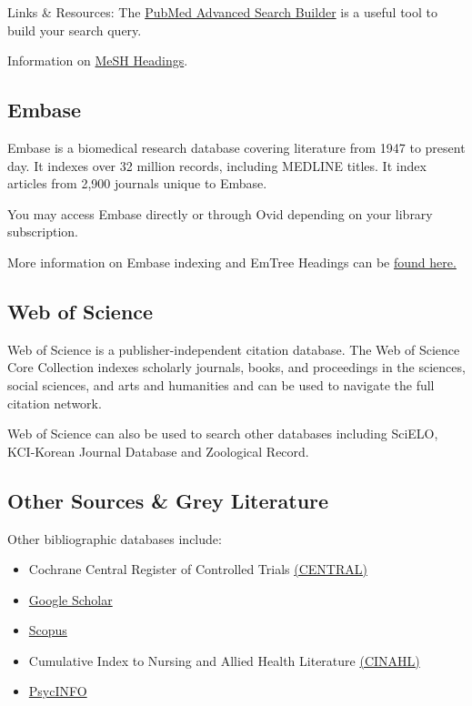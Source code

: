 \documentclass[
]{book}
\providecommand{\tightlist}{%
  \setlength{\itemsep}{0pt}\setlength{\parskip}{0pt}}
\begin{document}
Links \& Resources:
The \href{https://www.ncbi.nlm.nih.gov/pubmed/advanced}{PubMed Advanced Search Builder} is a useful tool to build your search query.

Information on \href{https://www.nlm.nih.gov/mesh/meshhome.html}{MeSH Headings}.

\hypertarget{embase}{%
\subsection{Embase}\label{embase}}

Embase is a biomedical research database covering literature from 1947 to present day. It indexes over 32 million records, including MEDLINE titles. It index articles from 2,900 journals unique to Embase.

You may access Embase directly or through Ovid depending on your library subscription.

More information on Embase indexing and EmTree Headings can be \href{https://www.elsevier.com/solutions/embase-biomedical-research/embase-coverage-and-content}{found here.}

\hypertarget{web-of-science}{%
\subsection{Web of Science}\label{web-of-science}}

Web of Science is a publisher-independent citation database. The Web of Science Core Collection indexes scholarly journals, books, and proceedings in the sciences, social sciences, and arts and humanities and can be used to navigate the full citation network.

Web of Science can also be used to search other databases including SciELO, KCI-Korean Journal Database and Zoological Record.

\hypertarget{other-sources-grey-literature}{%
\subsection{Other Sources \& Grey Literature}\label{other-sources-grey-literature}}

Other bibliographic databases include:

\begin{itemize}
\tightlist
\item
  Cochrane Central Register of Controlled Trials \href{https://www.cochranelibrary.com/central/about-central}{(CENTRAL)}
\item
  \href{https://scholar.google.com/}{Google Scholar}
\item
  \href{https://www.scopus.com/home.uri}{Scopus}
\item
  Cumulative Index to Nursing and Allied Health Literature \href{https://www.ebscohost.com/nursing/products/cinahl-databases/cinahl-complete}{(CINAHL)}
\item
  \href{https://www.apa.org/pubs/databases/psycinfo}{PsycINFO}
\end{itemize}
\end{document}
